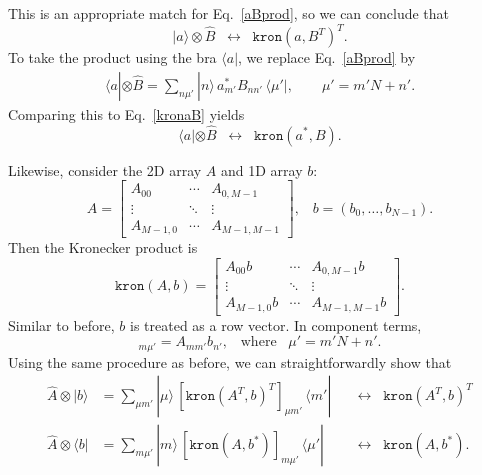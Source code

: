 \documentclass[pra,12pt]{revtex4}
\begin{document}
This is an appropriate match for Eq.~\eqref{aBprod}, so we can
conclude that
\begin{equation}
  |a\rangle \otimes \hat{B} \;\;\leftrightarrow\;\;
  \texttt{kron}(a, B^T)^T.
\end{equation}
To take the product using the bra $\langle a|$, we replace
Eq.~\eqref{aBprod} by
\begin{align}
  \langle a| \otimes \hat{B} = \sum_{n\mu'} |n\rangle \,
  a_{m'}^* B_{nn'} \, \langle \mu'|, \qquad \mu' = m'N + n'.
\end{align}
Comparing this to Eq.~\eqref{kronaB} yields
\begin{equation}
  \langle a| \otimes \hat{B} \;\;\leftrightarrow\;\;
  \texttt{kron}(a^*, B).
\end{equation}

Likewise, consider the 2D array $A$ and 1D array $b$:
\begin{equation}
  A = \begin{bmatrix}A_{00} & \cdots & A_{0,M-1} \\ \vdots & \ddots & \vdots \\ A_{M-1,0} & \cdots & A_{M-1,M-1} \end{bmatrix}, \;\;\;
  b = (b_0, \dots, b_{N-1}).
\end{equation}
Then the Kronecker product is
\begin{equation}
  \texttt{kron}(A, b) =
  \begin{bmatrix}
    A_{00} b & \cdots & A_{0,M-1} b \\
    \vdots & \ddots & \vdots \\
    A_{M-1,0} b & \cdots & A_{M-1,M-1} b
  \end{bmatrix}.
\end{equation}
Similar to before, $b$ is treated as a row vector.  In component
terms,
\begin{equation}
  [\texttt{kron}(A, b)]_{m\mu'} = A_{mm'} b_{n'}, \;\;\;\mathrm{where}\;\;\;
  \mu' = m'N+n'.
\end{equation}
Using the same procedure as before, we can straightforwardly show that
\begin{align}
  \hat{A} \otimes | b\rangle &=
  \sum_{\mu m'} |\mu\rangle \, [\texttt{kron}(A^T, b)^T]_{\mu m'}
  \, \langle m'| && \leftrightarrow \;\; \texttt{kron}(A^T, b)^T\\
  \hat{A} \otimes \langle b| &=
  \sum_{m\mu'} |m\rangle \, [\texttt{kron}(A, b^*)]_{m\mu'}
  \,  \langle \mu'| && \leftrightarrow \;\; \texttt{kron}(A, b^*).
\end{align}
\end{document}
